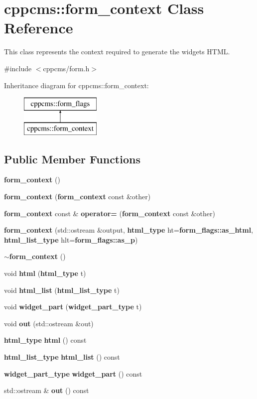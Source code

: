 \section{cppcms\+:\+:form\+\_\+context Class Reference}
\label{classcppcms_1_1form__context}


This class represents the context required to generate the widgets\textquotesingle{} H\+T\+ML.  




{\ttfamily \#include $<$cppcms/form.\+h$>$}

Inheritance diagram for cppcms\+:\+:form\+\_\+context\+:\begin{figure}[H]
\begin{center}
\leavevmode
\includegraphics[height=2.000000cm]{classcppcms_1_1form__context}
\end{center}
\end{figure}
\subsection*{Public Member Functions}
\begin{DoxyCompactItemize}
\item 
{\bf form\+\_\+context} ()
\item 
{\bf form\+\_\+context} ({\bf form\+\_\+context} const \&other)
\item 
{\bf form\+\_\+context} const \& {\bf operator=} ({\bf form\+\_\+context} const \&other)
\item 
{\bf form\+\_\+context} (std\+::ostream \&output, {\bf html\+\_\+type} ht={\bf form\+\_\+flags\+::as\+\_\+html}, {\bf html\+\_\+list\+\_\+type} hlt={\bf form\+\_\+flags\+::as\+\_\+p})
\item 
{\bf $\sim$form\+\_\+context} ()
\item 
void {\bf html} ({\bf html\+\_\+type} t)
\item 
void {\bf html\+\_\+list} ({\bf html\+\_\+list\+\_\+type} t)
\item 
void {\bf widget\+\_\+part} ({\bf widget\+\_\+part\+\_\+type} t)
\item 
void {\bf out} (std\+::ostream \&out)
\item 
{\bf html\+\_\+type} {\bf html} () const 
\item 
{\bf html\+\_\+list\+\_\+type} {\bf html\+\_\+list} () const 
\item 
{\bf widget\+\_\+part\+\_\+type} {\bf widget\+\_\+part} () const 
\item 
std\+::ostream \& {\bf out} () const 
\end{DoxyCompactItemize}
